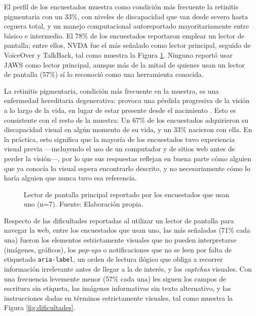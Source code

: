 El perfil de los encuestados muestra como condición más frecuente la retinitis pigmentaria con un 33\%, con niveles de discapacidad que van desde severo hasta ceguera total, y un manejo computacional autoreportado mayoritariamente entre básico e intermedio. El 78\% de los encuestados reportaron emplear un lector de pantalla; entre ellos, NVDA fue el más señalado como lector principal, seguido de VoiceOver y TalkBack, tal como muestra la Figura \ref{fig:lectorprincipal}. Ninguno reportó usar JAWS como lector principal, aunque más de la mitad de quienes usan un lector de pantalla (57\%) sí lo reconoció como una herramienta conocida.

La retinitis pigmentaria, condición más frecuente en la muestra, es una enfermedad hereditaria degenerativa: provoca una pérdida progresiva de la visión a lo largo de la vida, en lugar de estar presente desde el nacimiento \cite{natarajan2011retinitispigmentosa}. Esto es consistente con el resto de la muestra: Un 67\% de los encuestados adquirieron su discapacidad visual en algún momento de su vida, y un 33\% nacieron con ella. En la práctica, esto significa que la mayoría de los encuestados tuvo experiencia visual previa —incluyendo el uso de un computador y de sitios web antes de perder la visión—, por lo que sus respuestas reflejan en buena parte cómo alguien que ya conocía lo visual espera encontrarlo descrito, y no necesariamente cómo lo haría alguien que nunca tuvo esa referencia.

\begin{figure}[H]
    \centering
    \caption{\label{fig:lectorprincipal} Lector de pantalla principal reportado por los encuestados que usan uno (n=7). Fuente: Elaboración propia.}
\end{figure}

Respecto de las dificultades reportadas al utilizar un lector de pantalla para navegar la web, entre los encuestados que usan uno, las más señaladas (71\% cada una) fueron los elementos estrictamente visuales que no pueden interpretarse (imágenes, gráficos), los \textit{pop-ups} o notificaciones que no se leen por falta de etiquetado \texttt{aria-label}, un orden de lectura ilógico que obliga a recorrer información irrelevante antes de llegar a la de interés, y los \textit{captchas} visuales. Con una frecuencia levemente menor (57\% cada una) les siguen los campos de escritura sin etiqueta, las imágenes informativas sin texto alternativo, y las instrucciones dadas en términos estrictamente visuales, tal como muestra la Figura \ref{fig:dificultades}.

